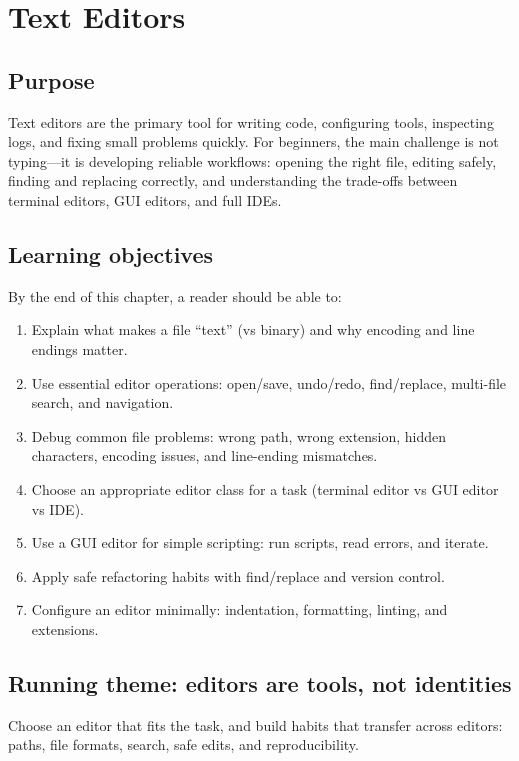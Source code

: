 \chapter{Text Editors}
\label{ch:text-editors}

\section*{Purpose}
Text editors are the primary tool for writing code, configuring tools, inspecting logs, and fixing small problems quickly. For beginners, the main challenge is not typing---it is developing reliable workflows: opening the right file, editing safely, finding and replacing correctly, and understanding the trade-offs between terminal editors, GUI editors, and full IDEs.

\section*{Learning objectives}
By the end of this chapter, a reader should be able to:
\begin{enumerate}
\item Explain what makes a file ``text'' (vs binary) and why encoding and line endings matter.
\item Use essential editor operations: open/save, undo/redo, find/replace, multi-file search, and navigation.
\item Debug common file problems: wrong path, wrong extension, hidden characters, encoding issues, and line-ending mismatches.
\item Choose an appropriate editor class for a task (terminal editor vs GUI editor vs IDE).
\item Use a GUI editor for simple scripting: run scripts, read errors, and iterate.
\item Apply safe refactoring habits with find/replace and version control.
\item Configure an editor minimally: indentation, formatting, linting, and extensions.
\end{enumerate}

\section*{Running theme: editors are tools, not identities}
Choose an editor that fits the task, and build habits that transfer across editors: paths, file formats, search, safe edits, and reproducibility.

